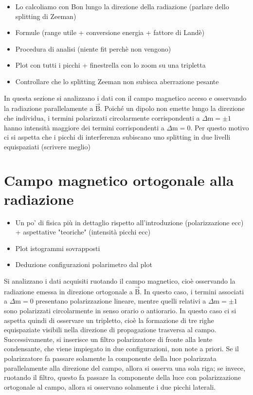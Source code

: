 \documentclass[twocolumn,10pt]{asme2ej}
\begin{document}
\begin{itemize}
    \item Lo calcoliamo con Bon lungo la direzione della radiazione (parlare dello splitting di Zeeman)
    \item Formule (range utile + conversione energia + fattore di Landè)
    \item Procedura di analisi (niente fit perchè non vengono)
    \item Plot con tutti i picchi + finestrella con lo zoom su una tripletta 
    \item Controllare che lo splitting Zeeman non subisca aberrazione pesante
\end{itemize}
In questa sezione si analizzano i dati con il campo magnetico acceso e osservando la radiazione parallelamente a $\vec{\text{B}}$.
Poiché un dipolo non emette lungo la direzione che individua, i termini polarizzati circolarmente corrispondenti a $\Delta \text{m} = \pm 1$
hanno intensità maggiore dei termini corrispondenti a $\Delta \text{m} = 0$. Per questo motivo ci si aspetta che i picchi di interferenza subiscano 
uno splitting in due livelli equispaziati (scrivere meglio)

\section{Campo magnetico ortogonale alla radiazione}

\begin{itemize}
    \item Un po' di fisica più in dettaglio rispetto all'introduzione (polarizzazione ecc) + aspettative "teoriche"
    (intensità picchi ecc)
    \item Plot istogrammi sovrapposti 
    \item Deduzione configurazioni polarimetro dal plot 
\end{itemize}
Si analizzano i dati acquisiti ruotando il campo magnetico, cioè osservando la radiazione emessa 
in direzione ortogonale a $\vec{\text{B}}$. In questo caso, i termini associati a $\Delta \text{m} = 0$ presentano polarizzazione lineare, 
mentre quelli relativi a $\Delta \text{m} = \pm 1$ sono polarizzati circolarmente in senso orario o antiorario. 
In questo caso ci si aspetta quindi di osservare un tripletto, cioè la formazione di tre righe equispaziate visibili nella direzione 
di propagazione trasversa al campo. Successivamente, si inserisce un filtro polarizzatore di fronte alla lente condensante, che viene impiegato in due configurazioni, non note a priori. 
Se il polarizzatore fa passare solamente la componente della luce polarizzata parallelamente alla direzione del campo, allora si osserva una sola riga; se invece, ruotando il filtro, questo 
fa passare la componente della luce con polarizzazione ortogonale al campo, allora si osservano solamente i due picchi laterali.  
\end{document}

